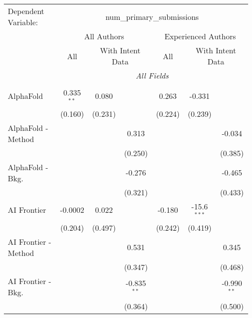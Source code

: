 \begingroup
\centering
\begin{tabular}{lcccccc}
   \tabularnewline \midrule \midrule
   Dependent Variable: & \multicolumn{6}{c}{num\_primary\_submissions}\\
 & \multicolumn{3}{c}{All Authors} & \multicolumn{3}{c}{Experienced Authors} \\
\cmidrule(lr){2-4} \cmidrule(lr){5-7}
 & \multicolumn{1}{c}{All} & \multicolumn{2}{c}{With Intent Data} & \multicolumn{1}{c}{All} & \multicolumn{2}{c}{With Intent Data} \\
\cmidrule(lr){2-2} \cmidrule(lr){3-4} \cmidrule(lr){5-5} \cmidrule(lr){6-7}
 & \multicolumn{6}{c}{\textit{All Fields}} \\ \\
   AlphaFold            & 0.335$^{**}$ & 0.080        &               & 0.263          & -0.331        &   \\   
                        & (0.160)      & (0.231)      &               & (0.224)        & (0.239)       &   \\   
   AlphaFold - Method   &              &              & 0.313         &                &               & -0.034\\   
                        &              &              & (0.250)       &                &               & (0.385)\\   
   AlphaFold - Bkg.     &              &              & -0.276        &                &               & -0.465\\   
                        &              &              & (0.321)       &                &               & (0.433)\\   
   AI Frontier          & -0.0002      & 0.022        &               & -0.180         & -15.6$^{***}$ &   \\   
                        & (0.204)      & (0.497)      &               & (0.242)        & (0.419)       &   \\   
   AI Frontier - Method &              &              & 0.531         &                &               & 0.345\\   
                        &              &              & (0.347)       &                &               & (0.468)\\   
   AI Frontier - Bkg.   &              &              & -0.835$^{**}$ &                &               & -0.990$^{**}$\\   
                        &              &              & (0.364)       &                &               & (0.500)\\   

\end{tabular}
